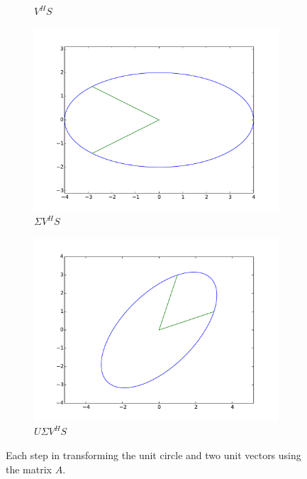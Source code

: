 \begin{figure}
\begin{subfigure}[b]{.49\textwidth}
  \caption{$V^HS$}
\end{subfigure}
\begin{subfigure}[b]{.49\textwidth}
  \centering
  \includegraphics[width=\textwidth]{svcircle.pdf}
  \caption{$\Sigma V^H S$}
\end{subfigure}
\begin{subfigure}[b]{.49\textwidth}
  \centering
  \includegraphics[width=\textwidth]{full_transformation.pdf}
  \caption{$U \Sigma V^H S$}
\end{subfigure}
\caption{Each step in transforming the unit circle and two unit vectors using the matrix $A$.}
\label{fig:sol1}
\end{figure}



